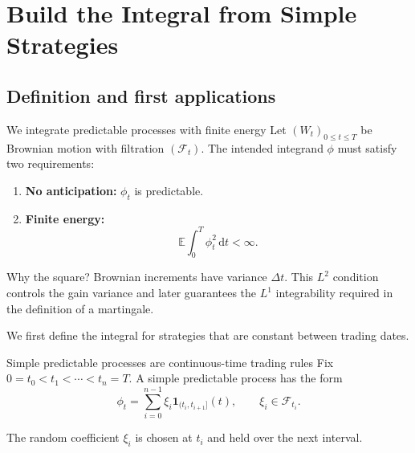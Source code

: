 \documentclass[handout,10pt,aspectratio=169]{beamer}
\newcommand{\E}{\mathbb E}
\newcommand{\F}{\mathcal F}
\newcommand{\dd}{\,\mathrm d}
\begin{document}
\section{Build the Integral from Simple Strategies}
\subsection{Definition and first applications}

\begin{frame}{We integrate predictable processes with finite energy}
Let \((W_t)_{0\le t\le T}\) be Brownian motion with filtration \((\F_t)\).
The intended integrand \(\phi\) must satisfy two requirements:
\begin{enumerate}\setlength{\itemsep}{0.75em}
  \item \textbf{No anticipation:} \(\phi_t\) is predictable.
  \item \textbf{Finite energy:}
  \[
  \E\int_0^T\phi_t^2\dd t<\infty.
  \]
\end{enumerate}
\begin{block}{Why the square?}
Brownian increments have variance \(\Delta t\). This \(L^2\) condition controls the gain variance and later guarantees the \(L^1\) integrability required in the definition of a martingale.
\end{block}
We first define the integral for strategies that are constant between trading dates.
\end{frame}

\begin{frame}{Simple predictable processes are continuous-time trading rules}
Fix \(0=t_0<t_1<\cdots<t_n=T\). A simple predictable process has the form
\[
\phi_t=\sum_{i=0}^{n-1}\xi_i\mathbf 1_{(t_i,t_{i+1}]}(t),
\qquad \xi_i\in\F_{t_i}.
\]
\begin{center}
\end{center}
The random coefficient \(\xi_i\) is chosen at \(t_i\) and held over the next interval.
\end{frame}
\end{document}
